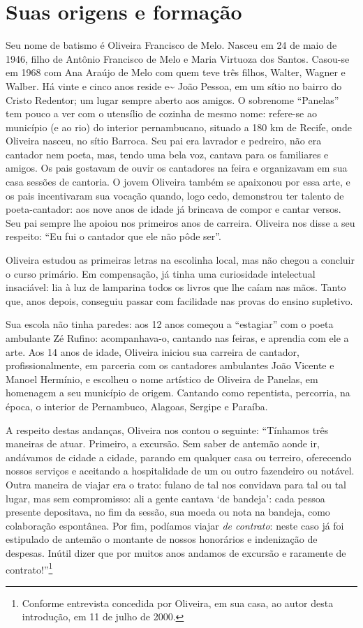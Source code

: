 \section{Suas origens e formação}

Seu nome de batismo é Oliveira Francisco de Melo.
Nasceu em 24 de maio de 1946, filho de Antônio Francisco
de Melo e Maria Virtuoza dos Santos. Casou-se em 1968
com Ana Araújo de Melo com quem teve três filhos, Walter,
Wagner e Walber. Há vinte e cinco anos reside e\~{} João
Pessoa, em um sítio no bairro do Cristo Redentor; um lugar
sempre aberto aos amigos. O sobrenome
``Panelas'' tem
pouco a ver com o utensílio de cozinha de mesmo nome:
refere-se ao município (e ao rio) do interior pernambucano,
situado a 180 km de Recife, onde Oliveira nasceu, no sítio
Barroca. Seu pai era lavrador e pedreiro, não era cantador
nem poeta, mas, tendo uma bela voz, cantava para os
familiares e amigos. Os pais gostavam de ouvir os cantadores
na feira e organizavam em sua casa sessões de cantoria. O
jovem Oliveira também se apaixonou por essa arte, e os pais
incentivaram sua vocação quando, logo cedo, demonstrou
ter talento de poeta-cantador: aos nove anos de idade já
brincava de compor e cantar versos. Seu pai sempre lhe
apoiou nos primeiros anos de carreira. Oliveira nos disse a
seu respeito: ``Eu fui o cantador que ele não pôde
ser''.

Oliveira estudou as primeiras letras na escolinha local,
mas não chegou a concluir o curso primário. Em
compensação, já tinha uma curiosidade intelectual
insaciável: lia à luz de lamparina todos os livros que lhe
caíam nas mãos. Tanto que, anos depois, conseguiu passar
com facilidade nas provas do ensino supletivo.

Sua escola não tinha paredes: aos 12 anos começou
a ``estagiar'' com o poeta ambulante Zé
Rufino:
acompanhava-o, cantando nas feiras, e aprendia com ele a
arte. Aos 14 anos de idade, Oliveira iniciou sua carreira de
cantador, profissionalmente, em parceria com os cantadores
ambulantes João Vicente e Manoel Hermínio, e escolheu
o nome artístico de Oliveira de Panelas, em homenagem a
seu município de origem. Cantando como repentista,
percorria, na época, o interior de Pernambuco, Alagoas,
Sergipe e Paraíba.

A respeito destas andanças, Oliveira nos contou o
seguinte: ``Tínhamos três maneiras de atuar. Primeiro, a
excursão. Sem saber de antemão aonde ir, andávamos de
cidade a cidade, parando em qualquer casa ou terreiro,
oferecendo nossos serviços e aceitando a hospitalidade de
um ou outro fazendeiro ou notável. Outra maneira de viajar
era o trato: fulano de tal nos convidava para tal ou tal lugar,
mas sem compromisso: ali a gente cantava `de
bandeja': cada pessoa presente depositava, no fim da sessão, sua
moeda ou nota na bandeja, como colaboração espontânea.
Por fim, podíamos viajar \textit{de contrato}: neste caso já foi
estipulado de antemão o montante de nossos honorários e
indenização de despesas. Inútil dizer que por muitos anos
andamos de excursão e raramente de contrato!''\footnote{ Conforme 
entrevista concedida por Oliveira, em sua casa, ao
autor desta introdução, em 11 de julho de 2000.}

